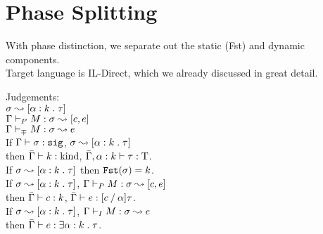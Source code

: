 
\newpage
\section{Phase Splitting}
With phase distinction, we separate out the static (Fst) and dynamic components. \\
Target language is IL-Direct, which we already discussed in great detail. %

Judgements: \\
$\sigma \leadsto [\alpha \mathrel{:} k\mathrel{.} \tau]$ \\
$\Gamma \vdash_P M \mathrel{:} \sigma \leadsto [c, e]$ \\
$\Gamma \vdash_\mp M \mathrel{:} \sigma \leadsto e$ \\

If $\Gamma \vdash \sigma \mathrel{:} \texttt{sig}$, $\sigma \leadsto [\alpha \mathrel{:} k\mathrel{.} \tau]$ \\
then $\bar\Gamma \vdash k \mathrel{:} \operatorname{kind}$, $\bar\Gamma, \alpha \mathrel{:} k \vdash \tau \mathrel{:} \operatorname{T}$. \\
If $\sigma \leadsto [\alpha \mathrel{:} k\mathrel{.} \tau]$ then $\texttt{Fst}(\sigma) = k$. \\

If $\sigma \leadsto [\alpha \mathrel{:} k\mathrel{.} \tau]$, $\Gamma \vdash_P M \mathrel{:} \sigma \leadsto [c, e]$ \\
then $\bar\Gamma \vdash c \mathrel{:} k$, $\bar\Gamma \vdash e \mathrel{:} [c \mathbin{/} \alpha]\tau$. \\

If $\sigma \leadsto [\alpha \mathrel{:} k\mathrel{.} \tau]$, $\Gamma \vdash_I M \mathrel{:} \sigma \leadsto e$ \\
then $\bar\Gamma \vdash e \mathrel{:} \exists\alpha \mathrel{:} k\mathrel{.} \tau$. \\

